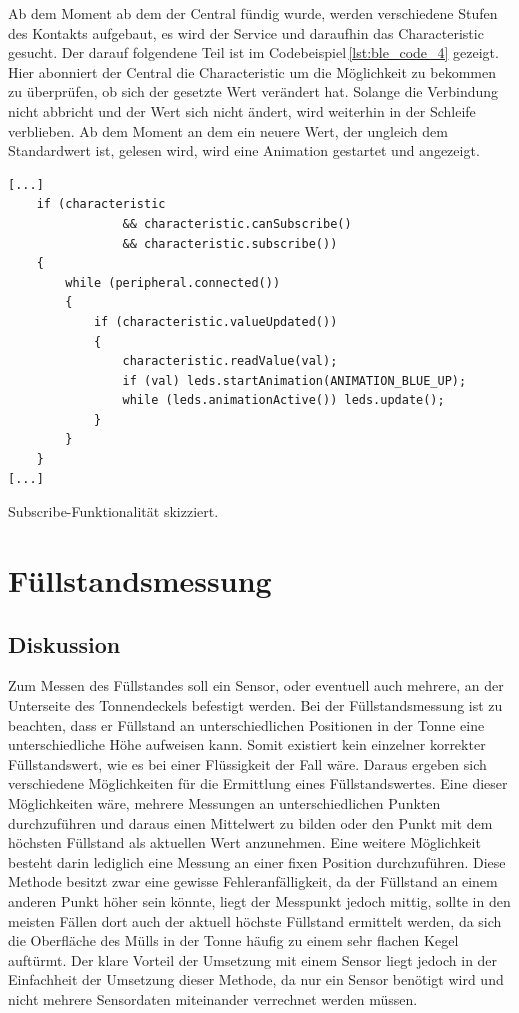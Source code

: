         Ab dem Moment ab dem der Central fündig wurde, werden verschiedene Stufen des Kontakts aufgebaut, es wird der Service und daraufhin das Characteristic gesucht. Der darauf folgendene Teil ist im Codebeispiel\,\ref{lst:ble_code_4} gezeigt. Hier abonniert der Central die Characteristic um die Möglichkeit zu bekommen zu überprüfen, ob sich der gesetzte Wert verändert hat.
        Solange die Verbindung nicht abbricht und der Wert sich nicht ändert, wird weiterhin in der Schleife verblieben. Ab dem Moment an dem ein neuere Wert, der ungleich dem Standardwert ist, gelesen wird, wird eine Animation gestartet und angezeigt.

\begin{listing}
    \begin{verbatim}
[...]
    if (characteristic 
                && characteristic.canSubscribe() 
                && characteristic.subscribe())
    {
        while (peripheral.connected())
        {
            if (characteristic.valueUpdated())
            {
                characteristic.readValue(val);
                if (val) leds.startAnimation(ANIMATION_BLUE_UP);
                while (leds.animationActive()) leds.update();
            }
        }
    }
[...]
    \end{verbatim}
    \caption{Subscribe-Funktionalität skizziert.}
    \label{lst:ble_code_4}
\end{listing}

\section{Füllstandsmessung}
    \subsection{Diskussion}
        Zum Messen des Füllstandes soll ein Sensor, oder eventuell auch mehrere, an der Unterseite des Tonnendeckels befestigt werden. Bei der Füllstandsmessung ist zu beachten, dass er Füllstand an unterschiedlichen Positionen in der Tonne eine unterschiedliche Höhe aufweisen kann. Somit existiert kein einzelner korrekter Füllstandswert, wie es bei einer Flüssigkeit der Fall wäre. Daraus ergeben sich verschiedene Möglichkeiten für die Ermittlung eines Füllstandswertes. Eine dieser Möglichkeiten wäre, mehrere Messungen an unterschiedlichen Punkten durchzuführen und daraus einen Mittelwert zu bilden oder den Punkt mit dem höchsten Füllstand als aktuellen Wert anzunehmen. Eine weitere Möglichkeit besteht darin lediglich eine Messung an einer fixen Position durchzuführen. Diese Methode besitzt zwar eine gewisse Fehleranfälligkeit, da der Füllstand an einem anderen Punkt höher sein könnte, liegt der Messpunkt jedoch mittig, sollte in den meisten Fällen dort auch der aktuell höchste Füllstand ermittelt werden, da sich die Oberfläche des Mülls in der Tonne häufig zu einem sehr flachen Kegel auftürmt. Der klare Vorteil der Umsetzung mit einem Sensor liegt jedoch in der Einfachheit der Umsetzung dieser Methode, da nur ein Sensor benötigt wird und nicht mehrere Sensordaten miteinander verrechnet werden müssen.\\
        
